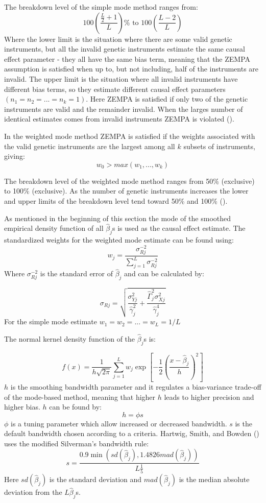 \documentclass[
]{article}
\begin{document}
The breakdown level of the simple mode method ranges from:
\[100\left(\frac{\frac{L}{2}+1}{L}\right)\%\text{ to }100\left(\frac{L-2}{L}\right)\tag{17}\]
Where the lower limit is the situation where there are some valid
genetic instruments, but all the invalid genetic instruments estimate
the same causal effect parameter - they all have the same bias term,
meaning that the ZEMPA assumption is satisfied when up to, but not
including, half of the instruments are invalid. The upper limit is the
situation where all invalid instruments have different bias terms, so
they estimate different causal effect parameters
\((n_1=n_2=...=n_k=1)\). Here ZEMPA is satisfied if only two of the
genetic instruments are valid and the remainder invalid. When the larges
number of identical estimates comes from invalid instruments ZEMPA is
violated ().

In the weighted mode method ZEMPA is satisfied if the weights associated
with the valid genetic instruments are the largest among all \(k\)
subsets of instruments, giving: \[w_0>max(w_1,...,w_k)\tag{18}\]

The breakdown level of the weighted mode method ranges from 50\%
(exclusive) to 100\% (exclusive). As the number of genetic instruments
increases the lower and upper limits of the breakdown level tend toward
50\% and 100\% ().

As mentioned in the beginning of this section the mode of the smoothed
empirical density function of all \(\hat\beta_j\)s is used as the causal
effect estimate. The standardized weights for the weighted mode estimate
can be found using:
\[w_j=\frac{\sigma_{Rj}^{-2}}{\sum_{j=1}^{L}\sigma_{Rj}^{-2}}\tag{19}\]
Where \(\sigma_{Rj}^{-2}\) is the standard error of \(\hat\beta_j\) and
can be calculated by:

\[\sigma_{Rj}=\sqrt{\frac{\sigma_{Yj}^{2}}{\hat\gamma_j^2}+\frac{\hat\Gamma_j^2\sigma_{Xj}^{2}}{\hat\gamma_j^4}}\tag{20}\]
For the simple mode estimate \(w_1=w_2=...=w_L=1/L\)

The normal kernel density function of the \(\hat\beta_j\)s is:

\[f(x)=\frac{1}{h\sqrt{2\pi}}\sum_{j=1}^{L}w_j\exp\left[-\frac{1}{2}\left(\frac{x-\hat\beta_j}{h}\right)^2\right]\tag{21}\]
\(h\) is the smoothing bandwidth parameter and it regulates a
bias-variance trade-off of the mode-based method, meaning that higher
\(h\) leads to higher precision and higher bias. \(h\) can be found by:
\[h=\phi s\tag{22}\] \(\phi\) is a tuning parameter which allow
increased or decreased bandwidth. \(s\) is the default bandwidth chosen
according to a criteria. Hartwig, Smith, and Bowden
() uses the modified Silverman's
bandwidth rule:
\[s=\frac{0.9\min(sd(\hat\beta_j),1.4826mad(\hat\beta_j))}{L\frac{1}{5}}\tag{23}\]
Here \(sd(\hat\beta_j)\) is the standard deviation and
\(mad(\hat\beta_j)\) is the median absolute deviation from the
\(L\hat\beta_j\)s.
\end{document}
